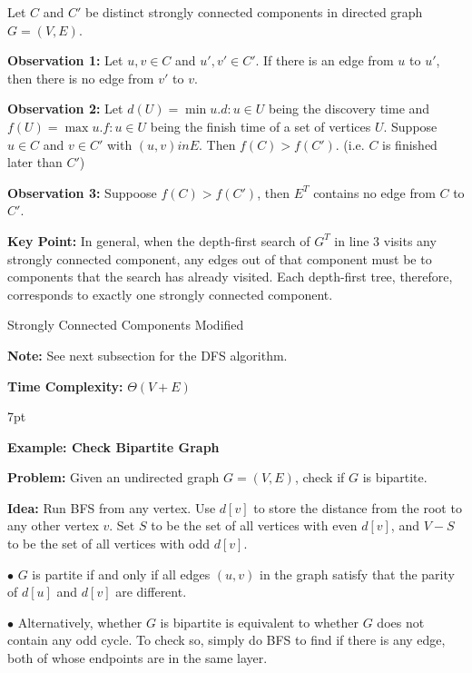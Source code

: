 \documentclass[10pt]{article}
\newenvironment{formal}[2]{%
	\def\FrameCommand{%
		\hspace{1pt}%
		{\color{#1}\vrule width 2pt}%
		{\color{#2}\vrule width 4pt}%
		\colorbox{#2}%
	}%
	\MakeFramed{\advance\hsize-\width\FrameRestore}%
	\noindent\hspace{-4.55pt}%
	\begin{adjustwidth}{}{7pt}%
		\vspace{2pt}\vspace{2pt}%
	}
	{%
		\vspace{2pt}\end{adjustwidth}\endMakeFramed%
}
\begin{document}
Let $C$ and $C'$ be distinct strongly connected components in directed graph $G=(V, E)$.

\textbf{Observation 1:} Let $u, v \in C$ and $u', v' \in C'$. If there is an edge from $u$ to $u'$, then there is no edge from $v'$ to $v$.

\textbf{Observation 2:} Let $d(U) = \min{u.d: u \in U}$ being the discovery time and $f(U) = \max{u.f: u \in U}$ being the finish time of a set of vertices $U$. Suppose $u \in C$ and $v \in C'$ with $(u, v) in E$. Then $f(C) > f(C')$. (i.e. $C$ is finished later than $C'$)

\textbf{Observation 3:} Suppoose $f(C) > f(C')$, then $E^T$ contains no edge from $C$ to $C'$.

\textbf{Key Point:} In general, when the depth-first search of 
$G^T$ in line 3 visits any strongly connected component, any edges out of that component must be to components that the search has already visited. Each depth-first tree, therefore, corresponds to exactly one strongly connected component.

\begin{algorithm}
	\SetAlgoLined

	\caption{Strongly Connected Components Modified}
\end{algorithm}

\textbf{Note:} See next subsection for the DFS algorithm.

\textbf{Time Complexity:} $\Theta(V+E)$

\newpage

\begin{formal}{Brown}{brownshade}
	
	\textbf{Example: Check Bipartite Graph}

	\textbf{Problem:} Given an undirected graph $G = (V, E)$, check if $G$ is bipartite.

	\textbf{Idea:} Run BFS from any vertex. Use $d[v]$ to store the distance from the root to any other vertex $v$. Set $S$ to be the set of all vertices with even $d[v]$, and $V-S$ to be the set of all vertices with odd $d[v]$.

	$\bullet$ $G$ is partite if and only if all edges $(u, v)$ in the graph satisfy that the parity of $d[u]$ and $d[v]$ are different.

	$\bullet$ Alternatively, whether $G$ is bipartite is equivalent to whether $G$ does not contain any odd cycle. To check so, simply do BFS to find if there is any edge, both of whose endpoints are in the same layer.
	
\end{formal}
\end{document}
